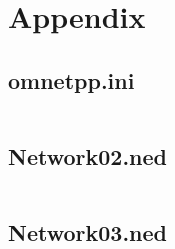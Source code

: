 \section*{Appendix}
\vspace{-3mm}
\subsection*{omnetpp.ini}
\vspace{-2mm}
\inputminted[framerule = 1pt,framesep = 2mm , frame = lines, fontsize=\scriptsize]{c}{./code/week12/Experiment_05/omnetpp.cpp}
\subsection*{Network02.ned}
\vspace{-2mm}
\inputminted[framerule = 1pt,framesep = 2mm , frame = lines, fontsize=\scriptsize]{c}{./code/week12/Experiment_05/Network02.cpp}
\subsection*{Network03.ned}
\vspace{-2mm}
\inputminted[framerule = 1pt,framesep = 2mm , frame = lines, fontsize=\scriptsize]{c}{./code/week12/Experiment_05/Network03.cpp}